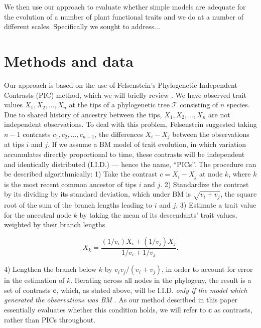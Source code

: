 \documentclass[12pt]{article}
\begin{document}
We then use our approach to evaluate whether simple models are adequate for the evolution of a number of plant functional traits and we do at a number of different scales. Specifically we sought to address...


\section*{Methods and data}

Our approach is based on the use of Felsenstein's \citep{Felsenstein1973, Felsenstein1985} Phylogenetic Independent Contrasts (PIC) method, which we will briefly review \citep[for more details, see][]{Felsenstein1985, Rohlf2001, Blomberg2012}. We have observed trait values $X_1, X_2, \ldots, X_n$ at the tips of a phylogenetic tree $\mathcal{T}$ consisting of $n$ species. Due to shared history of ancestry between the tips, $X_1, X_2, \ldots, X_n$ are not independent observations. To deal with this problem, Felsenstein suggested taking $n-1$ contrasts $c_1, c_2, \ldots, c_{n-1}$, the differences $X_{i} - X_{j}$ between the observations at tips $i$ and $j$. If we assume a BM model of trait evolution, in which variation accumulates directly proportional to time, these contrasts will be independent and identically distributed (I.I.D.) --- hence the name, ``PICs''. The procedure can be described algorithmically: 1) Take the contrast $c = X_i - X_j$ at node $k$, where $k$ is the most recent common ancestor of tips $i$ and $j$. 2) Standardize the contrast by its dividing by its standard deviation, which under BM is $\sqrt{v_i + v_j}$, the square root of the sum of the branch lengths leading to $i$ and $j$, 3) Estimate a trait value for the ancestral node $k$ by taking the mean of its descendants' trait values, weighted by their branch lengths

\begin{equation}
X_k = \frac{(1 / v_i)X_i + (1 / v_j)X_j}{1/v_i + 1/v_j}.
\end{equation}

4) Lengthen the branch below $k$ by $v_i v_j / (v_i + v_j)$, in order to account for error in the estimation of $k$. Iterating across all nodes in the phylogeny, the result is a set of contrasts $\mathbf{c}$, which, as stated above, will be I.I.D. \textit{only if the model which generated the observations was BM} \citep{Rohlf2001}. As our method described in this paper essentially evaluates whether this condition holds, we will refer to $\mathbf{c}$ as contrasts, rather than PICs throughout.
\end{document}
